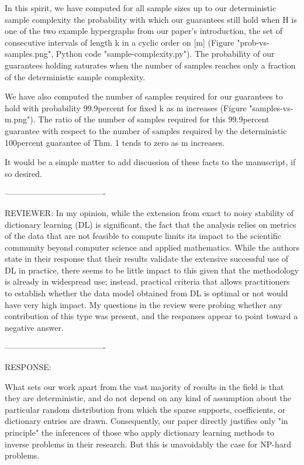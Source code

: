 In this spirit, we have computed for all sample sizes up to our deterministic sample complexity the probability with which our guarantees still hold when H is one of the two example hypergraphs from our paper's introduction, the set of consecutive intervals of length k in a cyclic order on [m] (Figure "prob-vs-samples.png", Python code "sample-complexity.py"). The probability of our guarantees holding saturates when the number of samples reaches only a fraction of the deterministic sample complexity. 

We have also computed the number of samples required for our guarantees to hold with probability 99.9percent for fixed k as m increases (Figure "samples-vs-m.png"). The ratio of the number of samples required for this 99.9percent guarantee with respect to the number of samples required by the deterministic 100percent guarantee of Thm. 1 tends to zero as m increases.

It would be a simple matter to add discussion of these facts to the manuscript, if so desired.

-------------------------------------

REVIEWER:
In my opinion, while the extension from exact to noisy stability of
dictionary learning (DL) is significant, the fact that the analysis relies
on metrics of the data that are not feasible to compute limits its impact
to the scientific community beyond computer science and applied
mathematics. While the authors state in their response that their results
validate the extensive successful use of DL in practice, there seems to be
little impact to this given that the methodology is already in widespread
use; instead, practical criteria that allows practitioners to establish
whether the data model obtained from DL is optimal or not would have very
high impact. My questions in the review were probing whether any
contribution of this type was present, and the responses appear to point
toward a negative answer.

-------------------------------------

RESPONSE:

What sets our work apart from the vast majority of results in the field is that they are deterministic, and do not depend on any kind of assumption about the particular random distribution from which the sparse supports, coefficients, or dictionary entries are drawn. Consequently, our paper directly justifies only "in principle" the inferences of those who apply dictionary learning methods to inverse problems in their research. But this is unavoidably the case for NP-hard problems.

